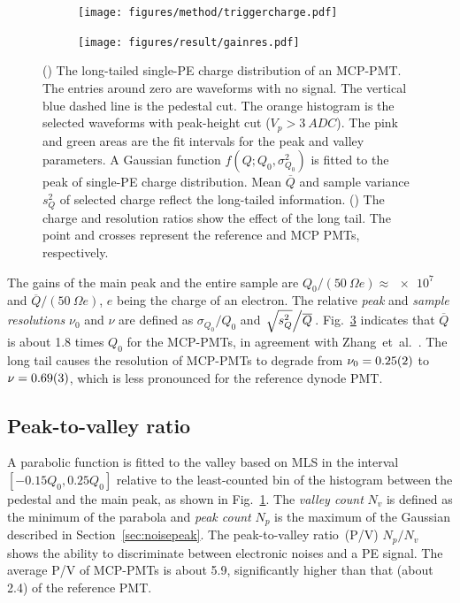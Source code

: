 \begin{figure}[!htbp]
    \centering
    \begin{subfigure}[b]{\SF\textwidth}
        \texttt{[image: figures/method/triggercharge.pdf]}
        \caption{}%
        \label{fig:triggercharge}
    \end{subfigure}
    \begin{subfigure}[b]{\SF\textwidth}
        \texttt{[image: figures/result/gainres.pdf]}
        \caption{}
        \label{fig:totalchargeCompare}
    \end{subfigure}
    \caption{() The long-tailed single-PE charge distribution of an MCP-PMT. The entries around zero are waveforms with no signal. The vertical blue dashed line is the pedestal cut. The orange histogram is the selected waveforms with peak-height cut ($V_p>\SI{3}{ADC}$). The pink and green areas are the fit intervals for the peak and valley parameters. A Gaussian function $f(Q;Q_0,\sigma^2_{Q_0})$ is fitted to the peak of single-PE charge distribution. Mean $\overline{Q}$ and sample variance $s_Q^2$ of selected charge reflect the long-tailed information. () The charge and resolution ratios show the effect of the long tail. The point and crosses represent the reference and MCP PMTs, respectively.
    }
\end{figure}

The gains of the main peak and the entire sample are ${Q_0}/({\SI{50}{\Omega}} e) \approx \num{e7}$ and ${\overline{Q}}/(\SI{50}{\Omega} e)$, $e$ being the charge of an electron. The relative \emph{peak} and \emph{sample resolutions} $\nu_0$ and $\nu$ are defined as ${\sigma_{Q_0}}/{Q_0}$ and \(\left.{\sqrt{s^2_{Q}}}\middle/{\overline{Q}}\right.\). Fig.~\ref{fig:totalchargeCompare} indicates that $\overline{Q}$ is about 1.8 times $Q_0$ for the MCP-PMTs, in agreement with Zhang~et~al.~\cite{JUNOLongtail}. The long tail causes the resolution of MCP-PMTs to degrade from $\nu_0=\num{0.25 \pm 0.02}$ to $\nu=\num{0.69 \pm 0.03}$, which is less pronounced for the reference dynode PMT.

\subsection{Peak-to-valley ratio}
\label{sec:PV}
A parabolic function is fitted to the valley based on MLS in the interval $[-0.15Q_0, 0.25Q_0]$ relative to the least-counted bin of the histogram between the pedestal and the main peak, as shown in Fig.~\ref{fig:triggercharge}. The \emph{valley count} $N_v$ is defined as the minimum of the parabola and \emph{peak count} $N_p$ is the maximum of the Gaussian described in Section~\ref{sec:noisepeak}. The peak-to-valley ratio~(P/V) ${N_p}/{N_v}$ shows the ability to discriminate between electronic noises and a PE signal. The average P/V of MCP-PMTs is about 5.9, significantly higher than that (about 2.4) of the reference PMT.

